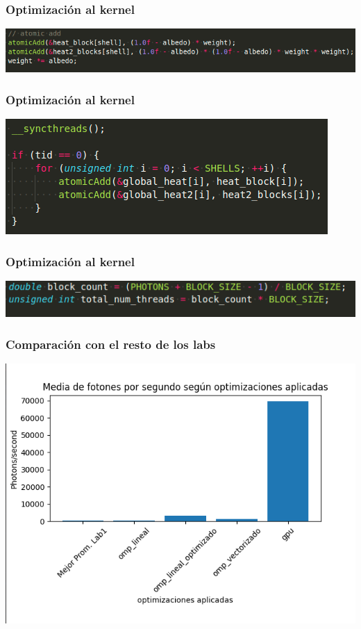 \documentclass{beamer}
\begin{document}
\begin{frame}
    \frametitle{Optimización al kernel}
    \includegraphics[width=\textwidth]{imagenes/code8.png}
\end{frame}

\begin{frame}
    \frametitle{Optimización al kernel}
    \includegraphics[width=\textwidth]{imagenes/code9.png}
\end{frame}

\begin{frame}
    \frametitle{Optimización al kernel}
    \includegraphics[width=\textwidth]{imagenes/code10.png}
\end{frame}

\begin{frame}
    \frametitle{Comparación con el resto de los labs}
    \includegraphics[width=\textwidth]{imagenes/media_opt_gpu.png}
\end{frame}
\end{document}
